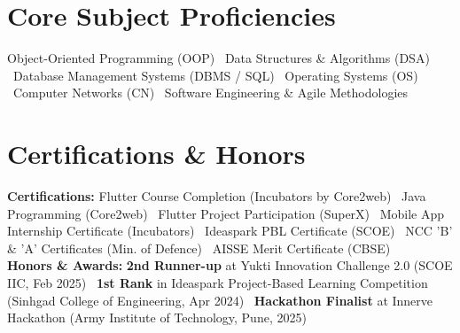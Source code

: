\documentclass[letterpaper,10pt]{article}
\begin{document}
\section{Core Subject Proficiencies}
 \begin{itemize}[leftmargin=0.15in, label={}]
    \small{\item{
     Object-Oriented Programming (OOP) \textbar\ Data Structures \& Algorithms (DSA) \textbar\ Database Management Systems (DBMS / SQL) \textbar\ Operating Systems (OS) \textbar\ Computer Networks (CN) \textbar\ Software Engineering \& Agile Methodologies
    }}
 \end{itemize}

\section{Certifications \& Honors}
 \begin{itemize}[leftmargin=0.15in, label={}]
    \small{\item{
     \textbf{Certifications:} Flutter Course Completion (Incubators by Core2web) \textbar\ Java Programming (Core2web) \textbar\ Flutter Project Participation (SuperX) \textbar\ Mobile App Internship Certificate (Incubators) \textbar\ Ideaspark PBL Certificate (SCOE) \textbar\ NCC 'B' \& 'A' Certificates (Min. of Defence) \textbar\ AISSE Merit Certificate (CBSE) \\
     \textbf{Honors \& Awards:} \textbf{2nd Runner-up} at Yukti Innovation Challenge 2.0 (SCOE IIC, Feb 2025) \textbar\ \textbf{1st Rank} in Ideaspark Project-Based Learning Competition (Sinhgad College of Engineering, Apr 2024) \textbar\ \textbf{Hackathon Finalist} at Innerve Hackathon (Army Institute of Technology, Pune, 2025)
    }}
 \end{itemize}
\end{document}
